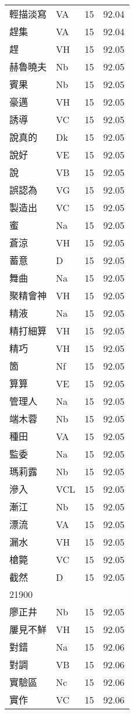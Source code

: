 \documentclass[twocolumn]{book}
\begin{document}
\begin{supertabular}{llrr}
輕描淡寫 & VA & 15 &  92.04\\
趕集 & VA & 15 &  92.04\\
趕 & VH & 15 &  92.05\\
赫魯曉夫 & Nb & 15 &  92.05\\
賓果 & Nb & 15 &  92.05\\
豪邁 & VH & 15 &  92.05\\
誘導 & VC & 15 &  92.05\\
說真的 & Dk & 15 &  92.05\\
說好 & VE & 15 &  92.05\\
說 & VB & 15 &  92.05\\
誤認為 & VG & 15 &  92.05\\
製造出 & VC & 15 &  92.05\\
蜜 & Na & 15 &  92.05\\
蒼涼 & VH & 15 &  92.05\\
蓄意 & D & 15 &  92.05\\
舞曲 & Na & 15 &  92.05\\
聚精會神 & VH & 15 &  92.05\\
精液 & Na & 15 &  92.05\\
精打細算 & VH & 15 &  92.05\\
精巧 & VH & 15 &  92.05\\
箇 & Nf & 15 &  92.05\\
算算 & VE & 15 &  92.05\\
管理人 & Na & 15 &  92.05\\
端木蓉 & Nb & 15 &  92.05\\
種田 & VA & 15 &  92.05\\
監委 & Na & 15 &  92.05\\
瑪莉露 & Nb & 15 &  92.05\\
滲入 & VCL & 15 &  92.05\\
漸江 & Nb & 15 &  92.05\\
漂流 & VA & 15 &  92.05\\
漏水 & VH & 15 &  92.05\\
槍斃 & VC & 15 &  92.05\\
截然 & D & 15 &  92.05\\
21900\\
廖正井 & Nb & 15 &  92.05\\
屢見不鮮 & VH & 15 &  92.05\\
對錯 & Na & 15 &  92.06\\
對調 & VB & 15 &  92.06\\
實驗區 & Nc & 15 &  92.06\\
實作 & VC & 15 &  92.06\\

\end{supertabular}
\end{document}
